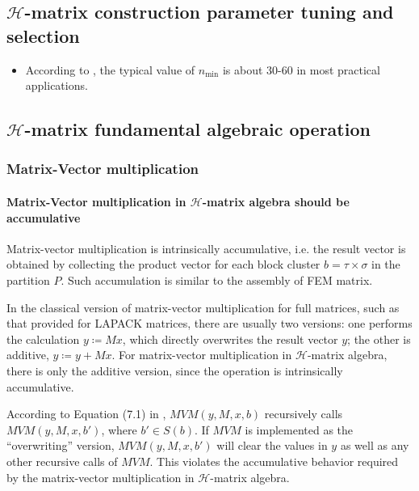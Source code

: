 \documentclass[11pt, a4paper]{article}
\begin{document}
\subsection{$\mathcal{H}$-matrix construction parameter tuning and selection}

\begin{itemize}
\item According to \cite{KriemannParallel2005a}, the typical value of $n_{\min}$ is about
  30-60 in most practical applications.
\end{itemize}

\subsection{$\mathcal{H}$-matrix fundamental algebraic operation}

\subsubsection{Matrix-Vector multiplication}
\label{sec:hmat-vmult}

\paragraph{Matrix-Vector multiplication in $\mathcal{H}$-matrix algebra should be accumulative}

Matrix-vector multiplication is intrinsically accumulative, i.e. the result vector is obtained by
collecting the product vector for each block cluster $b=\tau\times\sigma$ in the partition $P$. Such
accumulation is similar to the assembly of FEM matrix.

In the classical version of matrix-vector multiplication for full matrices, such as that provided
for LAPACK matrices, there are usually two versions: one performs the calculation $y \coloneqq Mx$,
which directly overwrites the result vector $y$; the other is additive, $y \coloneqq y + Mx$. For
matrix-vector multiplication in $\mathcal{H}$-matrix algebra, there is only the additive version,
since the operation is intrinsically accumulative.

According to Equation (7.1) in \cite{HackbuschHierarchical2015}, $MVM(y, M, x, b)$
recursively calls $MVM(y, M, x, b')$, where $b'\in S(b)$. If $MVM$ is implemented as the
``overwriting'' version, $MVM(y, M, x, b')$ will clear the values in $y$ as well as any other
recursive calls of $MVM$. This violates the accumulative behavior required by the matrix-vector
multiplication in $\mathcal{H}$-matrix algebra.
\end{document}
